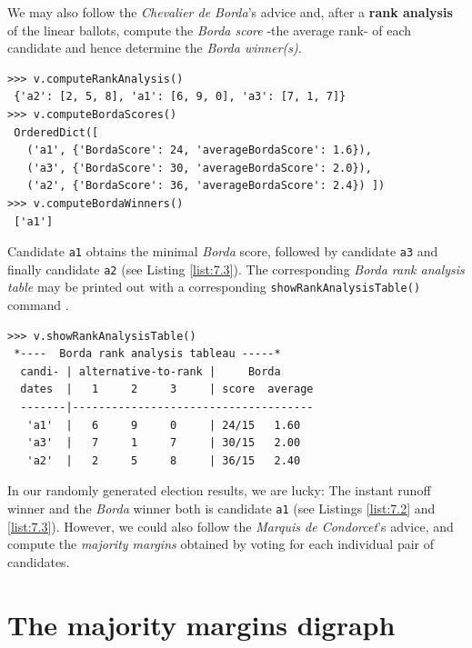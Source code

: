 We may also follow the \emph{Chevalier de Borda}'s advice and, after a \textbf{rank analysis} of the linear ballots, compute the \emph{Borda score} -the average rank- of each candidate and hence determine the \emph{Borda winner(s)}.
\begin{lstlisting}[caption={Example of \emph{Borda} rank scores},label=list:7.3]
>>> v.computeRankAnalysis()
 {'a2': [2, 5, 8], 'a1': [6, 9, 0], 'a3': [7, 1, 7]}
>>> v.computeBordaScores()
 OrderedDict([
   ('a1', {'BordaScore': 24, 'averageBordaScore': 1.6}),
   ('a3', {'BordaScore': 30, 'averageBordaScore': 2.0}),
   ('a2', {'BordaScore': 36, 'averageBordaScore': 2.4}) ])
>>> v.computeBordaWinners()
 ['a1']
\end{lstlisting}
Candidate \texttt{a1} obtains the minimal \emph{Borda} score, followed by candidate \texttt{a3} and finally candidate \texttt{a2} (see Listing \ref{list:7.3}). The corresponding \emph{Borda rank analysis table} may be printed out with a corresponding \texttt{showRankAnalysisTable()} command .
\begin{lstlisting}[caption={Rank analysis example},label=list:7.4]
>>> v.showRankAnalysisTable()
 *----  Borda rank analysis tableau -----*
  candi- | alternative-to-rank |     Borda
  dates  |   1     2     3     | score  average
  -------|-------------------------------------
   'a1'  |   6     9     0     | 24/15   1.60
   'a3'  |   7     1     7     | 30/15   2.00
   'a2'  |   2     5     8     | 36/15   2.40
 \end{lstlisting}

In our randomly generated election results, we are lucky: The instant runoff winner and the \emph{Borda} winner both is candidate \texttt{a1} (see Listings \ref{list:7.2} and \ref{list:7.3}). However, we could also follow the \emph{Marquis de Condorcet}'s advice, and compute the \emph{majority margins} obtained by voting for each individual pair of candidates.

\section{The majority margins digraph}
\label{sec:7.3}

